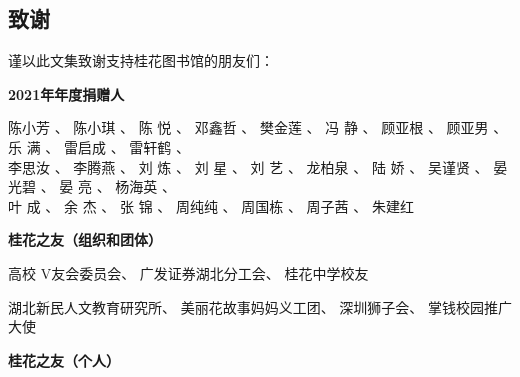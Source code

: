 \vspace{10pt}
{\centering\subsection*{致谢}}


\renewcommand{\leftmark}{致谢}
\vspace{20pt}

谨以此文集致谢支持桂花图书馆的朋友们：\\


\centerline{\textbf{2021年年度捐赠人}}



\begin{center}


陈小芳	、
陈小琪	、
陈 \quad   悦	、
邓鑫哲	、
樊金莲	、
冯 \quad 静	、
顾亚根	、
顾亚男	、
乐 \quad 满	、
雷启成	、
雷轩鹤	、\\
李思汝	、
李腾燕	、
刘 \quad 炼	、
刘 \quad 星	、
刘 \quad 艺	、
龙柏泉	、
陆 \quad 娇	、
吴谨贤	、
晏光碧	、
晏 \quad 亮	、
杨海英	、\\
叶 \quad 成	、
余 \quad 杰	、
张 \quad 锦	、
周纯纯	、
周国栋	、
周子茜	、
朱建红 
\end{center}

\centerline{\textbf{桂花之友（组织和团体）}}



\begin{center}
高校 V友会委员会、
广发证券湖北分工会、
桂花中学校友

湖北新民人文教育研究所、
美丽花故事妈妈义工团、
深圳狮子会、
掌钱校园推广大使
\end{center}

\centerline{\textbf{桂花之友（个人）}}




